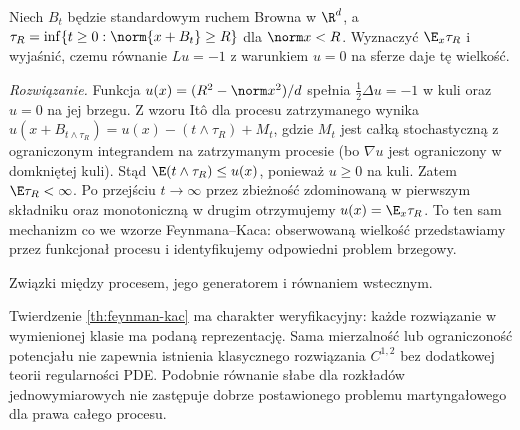 \begin{zadanie}
Niech $B_t$ będzie standardowym ruchem Browna w $\R^d$,
a $\tau_R=\inf\{t\ge0:\norm{x+B_t}\ge R\}$ dla $\norm x<R$.
Wyznaczyć $\E_x\tau_R$ i wyjaśnić, czemu równanie
$Lu=-1$ z warunkiem $u=0$ na sferze daje tę wielkość.

\emph{Rozwiązanie.} Funkcja
$u(x)=(R^2-\norm x^2)/d$ spełnia
$\frac12\Delta u=-1$ w kuli oraz $u=0$ na jej brzegu.
Z wzoru Itô dla procesu zatrzymanego wynika
$u(x+B_{t\wedge\tau_R})=u(x)-(t\wedge\tau_R)+M_t$,
gdzie $M_t$ jest całką stochastyczną z ograniczonym
integrandem na zatrzymanym procesie (bo $\nabla u$ jest
ograniczony w domkniętej kuli). Stąd
$\E(t\wedge\tau_R)\le u(x)$,
ponieważ $u\ge0$ na kuli. Zatem $\E\tau_R<\infty$.
Po przejściu $t\to\infty$ przez zbieżność zdominowaną
w pierwszym składniku oraz monotoniczną w drugim
otrzymujemy $u(x)=\E_x\tau_R$.
To ten sam mechanizm co we wzorze Feynmana--Kaca:
obserwowaną wielkość przedstawiamy przez funkcjonał
procesu i identyfikujemy odpowiedni problem brzegowy.
\end{zadanie}

\begin{center}
\par\smallskip\small Związki między procesem, jego generatorem i równaniem wstecznym.
\end{center}

\begin{uwaga}
Twierdzenie \ref{th:feynman-kac} ma charakter weryfikacyjny:
każde rozwiązanie w wymienionej klasie ma podaną reprezentację.
Sama mierzalność lub ograniczoność potencjału nie zapewnia
istnienia klasycznego rozwiązania $C^{1,2}$ bez dodatkowej
teorii regularności PDE. Podobnie równanie słabe dla rozkładów
jednowymiarowych nie zastępuje dobrze postawionego problemu
martyngałowego dla prawa całego procesu.
\end{uwaga}

